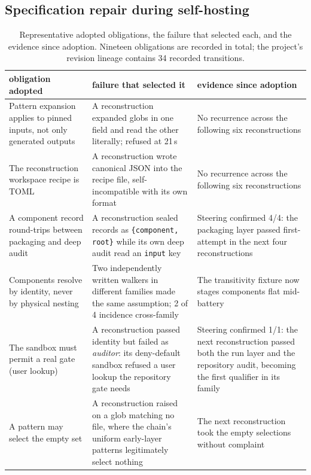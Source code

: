 \documentclass[10pt,twocolumn]{article}
\begin{document}
\subsection{Specification repair during self-hosting}
\label{sec:repair}

\begin{table}[t]
\centering\small
\caption{Representative adopted obligations, the failure that selected
each, and the evidence since adoption. Nineteen obligations are recorded
in total; the project's revision lineage contains 34 recorded
transitions.}
\label{tab:repairs}
\begin{tabular}{@{}p{}p{}p{}@{}}
\toprule
obligation adopted & failure that selected it & evidence since adoption \\
\midrule
Pattern expansion applies to pinned inputs, not only generated outputs
  & A reconstruction expanded globs in one field and read the other
    literally; refused at 21\,s
  & No recurrence across the following six reconstructions \\
The reconstruction workspace recipe is TOML
  & A reconstruction wrote canonical JSON into the recipe file,
    self-incompatible with its own format
  & No recurrence across the following six reconstructions \\
A component record round-trips between packaging and deep audit
  & A reconstruction sealed records as \texttt{\{component, root\}}
    while its own deep audit read an \texttt{input} key
  & Steering confirmed 4/4: the packaging layer passed first-attempt in
    the next four reconstructions \\
Components resolve by identity, never by physical nesting
  & Two independently written walkers in different families made the
    same assumption; 2 of 4 incidence cross-family
  & The transitivity fixture now stages components flat mid-battery \\
The sandbox must permit a real gate (user lookup)
  & A reconstruction passed identity but failed as \emph{auditor}: its
    deny-default sandbox refused a user lookup the repository gate needs
  & Steering confirmed 1/1: the next reconstruction passed both the run
    layer and the repository audit, becoming the first qualifier in its
    family \\
A pattern may select the empty set
  & A reconstruction raised on a glob matching no file, where the chain's
    uniform early-layer patterns legitimately select nothing
  & The next reconstruction took the empty selections without complaint \\

\end{tabular}
\end{table}
\end{document}
